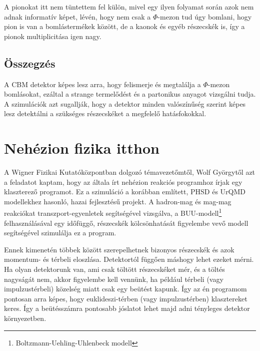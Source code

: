 \documentclass[a4paper,12pt]{article}
\begin{document}
\par A pionokat itt nem tüntettem fel külön, mivel egy ilyen folyamat során azok nem adnak informatív képet, lévén, hogy nem csak a 
$\Phi$-mezon tud úgy bomlani, hogy pion is van a bomlástermékek között, de a kaonok és egyéb részecskék is, így a pionok multiplicitása igen
nagy.
\subsection{ Összegzés}
\vspace{5mm}
\par A CBM detektor képes lesz arra, hogy felismerje és megtalálja a $\Phi$-mezon bomlásokat, ezáltal a strange termelődést és a 
partonikus anyagot vizsgálni tudja. A szimulációk azt sugallják, hogy a detektor minden valószínűség szerint képes lesz detektálni a 
szükséges részecskéket a megfelelő hatásfokokkal.
\section{ Nehézion fizika itthon }
\vspace{5mm}
\par A Wigner Fizikai Kutatóközpontban dolgozó témavezetőmtől, Wolf Györgytől azt a feladatot kaptam, hogy az általa írt nehézion reakciós
programhoz írjak egy klaszterező programot. Ez a szimuláció a korábban említett, PHSD és UrQMD modellekhez hasonló, hazai fejlesztésű
projekt. A hadron-mag és mag-mag reakciókat transzport-egyenletek segítségével vizsgálva, a BUU-modell\footnote{Boltzmann-Uehling-Uhlenbeck modell}
felhasználásával egy időfüggő, részecskék kölcsönhatását figyelembe vevő modell segítségével szimulálja ez a program.
\par Ennek kimenetén többek között szerepelhetnek bizonyos részecskék és azok momentum- és térbeli eloszlása. Detektortól függően
máshogy lehet ezeket mérni. Ha olyan detektorunk van, ami csak töltött részecskéket mér, és a töltés nagyságát nem, akkor figyelembe
kell vennünk, ha például térbeli (vagy impulzustérbeli) közelség miatt csak egy beütést kapunk. Így az én programom pontosan arra képes, hogy
euklideszi-térben (vagy impulzustérben) klasztereket keres. Így a beütésszámra pontosabb jóslatot lehet majd adni tényleges detektor
környezetben.
\end{document}
